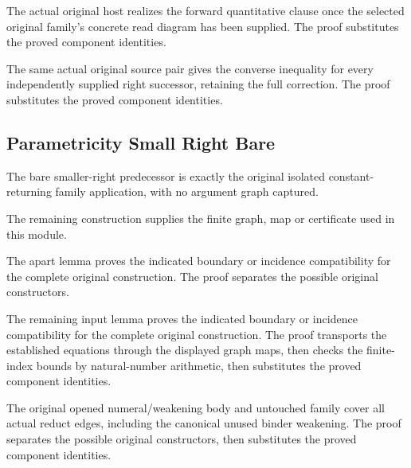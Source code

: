 The actual original host realizes the forward quantitative clause once
the selected original family's concrete read diagram has been supplied.
The proof substitutes the proved component identities.
\par{}

The same actual original source pair gives the converse inequality for
every independently supplied right successor, retaining the full correction.
The proof substitutes the proved component identities.
\par{}

\subsection{Parametricity Small Right Bare}
The bare smaller-right predecessor is exactly the original isolated
constant-returning family application, with no argument graph captured.

The remaining construction supplies the finite graph, map or certificate used in this module.
\par{}

The apart lemma proves the indicated boundary or incidence compatibility for the complete original construction.
The proof separates the possible original constructors.
\par{}

The remaining input lemma proves the indicated boundary or incidence compatibility for the complete original construction.
The proof transports the established equations through the displayed graph maps, then checks the finite-index bounds by natural-number arithmetic, then substitutes the proved component identities.
\par{}

The original opened numeral/weakening body and untouched family cover
all actual reduct edges, including the canonical unused binder weakening.
The proof separates the possible original constructors, then substitutes the proved component identities.
\par{}

